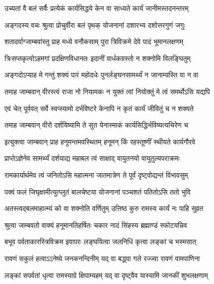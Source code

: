 
\twolineshloka
{उच्यतां वै बलं सर्वैः प्रत्येकं कार्यसिद्धये}
{केन वा साध्यते कार्यं जानीमस्तदनन्तरम्} %

\twolineshloka
{अङ्गदस्य वचः श्रुत्वा प्रोचुर्वीरा बलं पृथक्}
{योजनानां दशारभ्य दशोत्तरगुणं जगुः} %

\twolineshloka
{शतादर्वाग्जाम्बवांस्तु प्राह मध्ये वनौकसाम्}
{पुरा त्रिविक्रमे देवे पादं भूमानलक्षणम्} %

\twolineshloka
{त्रिःसप्तकृत्वोऽहमगां प्रदक्षिणविधानतः}
{इदानीं वार्धकग्रस्तो न शक्नोमि विलङ्घितुम्} %

\twolineshloka
{अङ्गदोऽप्याह मे गन्तुं शक्यं पारं महोदधेः}
{पुनर्लङ्घनसामर्थ्यं न जानाम्यस्ति वा न वा} %

\twolineshloka
{तमाह जाम्बवान् वीरस्त्वं राजा नो नियामकः}
{न युक्तं त्वां नियोक्तुं मे त्वं समर्थोऽसि यद्यपि} %


\twolineshloka
{एवं चेत् पूर्ववत् सर्वे स्वप्स्यामो दर्भविष्टरे}
{केनापि न कृतं कार्यं जीवितुं च न शक्यते} %

\twolineshloka
{तमाह जाम्बवान् वीरो दर्शयिष्यामि ते सुत}
{येनास्माकं कार्यसिद्धिर्भविष्यत्यचिरेण च} %

\twolineshloka
{इत्युक्त्वा जाम्बवान् प्राह हनूमन्तमवस्थितम्}
{हनूमन् किं रहस्तूष्णीं स्थीयते कार्यगौरवे} %

\twolineshloka
{प्राप्तेऽज्ञेनेव सामर्थ्यं दर्शयाद्य महाबल}
{त्वं साक्षाद् वायुतनयो वायुतुल्यपराक्रमः} %

\twolineshloka
{रामकार्यार्थमेव त्वं जनितोऽसि महात्मना}
{जातमात्रेण ते पूर्वं दृष्ट्वोद्यन्तं विभावसुम्} %

\twolineshloka
{पक्वं फलं जिघृक्षामीत्युत्प्लुतं बालचेष्टया}
{योजनानां पञ्चशतं पतितोऽसि ततो भुवि} %

\twolineshloka
{अतस्त्वद्बलमाहात्म्यं को वा शक्नोति वर्णितुम्}
{उत्तिष्ठ कुरु रामस्य कार्यं नः पाहि सुव्रत} %

\twolineshloka
{श्रुत्वा जाम्बवतो वाक्यं हनूमानतिहर्षितः}
{चकार नादं सिंहस्य ब्रह्माण्डं स्फोटयन्निव} %

\twolineshloka
{बभूव पर्वताकारस्त्रिविक्रम इवापरः}
{लङ्घयित्वा जलनिधिं कृत्वा लङ्कां च भस्मसात्} %

\twolineshloka
{रावणं सकुलं हत्वाऽऽनेष्ये जनकनन्दिनीम्}
{यद् वा बद्\mbox{}ध्वा गले रज्ज्वा रावणं वामपाणिना} %

\twolineshloka
{लङ्कां सपर्वतां धृत्वा रामस्याग्रे क्षिपाम्यहम्}
{यद् वा दृष्ट्वैव यास्यामि जानकीं शुभलक्षणाम्} %

